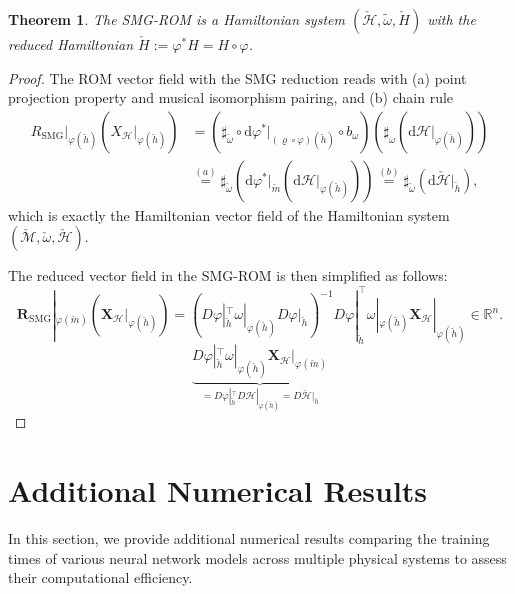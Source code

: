 \documentclass{article}
\theoremstyle{plain}
\newtheorem{theorem}{Theorem}[section]
\theoremstyle{definition}
\theoremstyle{remark}
\begin{document}
\begin{theorem}
\label{thm: SMG}
\textit{The SMG-ROM is a Hamiltonian system $(\check{\mathcal{H}}, \tilde{\omega}, \check{H})$ with the reduced Hamiltonian $\check{H} := \varphi^* H = H\circ \varphi$.}    
\end{theorem}
\begin{proof}
The ROM vector field with the SMG reduction reads with (a) point projection property and musical isomorphism pairing, and (b) chain rule
\begin{align}
R_{\text{SMG}}|_{\varphi(\check{h})}\left(X_\mathcal{H}|_{\varphi(\check{h})}\right) &= \left(\sharp_{\check{\omega}} \circ \mathrm{d}\varphi^*|_{(\varrho \circ \varphi)(\check{h})} \circ b_\omega\right)\left(\sharp_\omega\left(\mathrm{d}\mathcal{H}|_{\varphi(\check{h})}\right)\right) \\
&\stackrel{(a)}{=} \sharp_{\check{\omega}}\left(\mathrm{d}\varphi^*|_{\check{m}}\left(\mathrm{d}\mathcal{H}|_{\varphi(\check{h})}\right)\right) \stackrel{(b)}{=} \sharp_{\check{\omega}}\left(\mathrm{d}\check{\mathcal{H}}|_{\check{h}}\right), \nonumber
\end{align}
which is exactly the Hamiltonian vector field of the Hamiltonian system $(\check{\mathcal{M}}, \check{\omega}, \check{\mathcal{H}})$. 

The reduced vector field in the SMG-ROM is then simplified as follows:
\begin{equation}
\boldsymbol{R}_{\text{SMG}}|_{\varphi(\check{m})}\left(\boldsymbol{X}_\mathcal{H}|_{\varphi(\check{h})}\right) = \left(D\varphi|_{\check{h}}^{\top} \omega|_{\varphi(\check{h})} D\varphi|_{\check{h}}\right)^{-1} D\varphi|_{\check{h}}^{\top} \omega|_{\varphi(\check{h})} \boldsymbol{X}_\mathcal{H}|_{\varphi(\check{h})} \in \mathbb{R}^n. 
\end{equation}
\begin{equation*}
\underbrace{D\varphi|_{\check{h}}^{\top} \omega|_{\varphi(\check{h})} \boldsymbol{X}_\mathcal{H}|_{\varphi(\check{m})}}_{= D\varphi|_{\check{h}}^{\top} D\mathcal{H}|_{\varphi(\check{h})} = D\check{\mathcal{H}}|_{\check{h}}}
\end{equation*}
\end{proof}

\section{Additional Numerical Results}


In this section, we provide additional numerical results comparing the training times of various neural network models across multiple physical systems to assess their computational efficiency.
\end{document}
